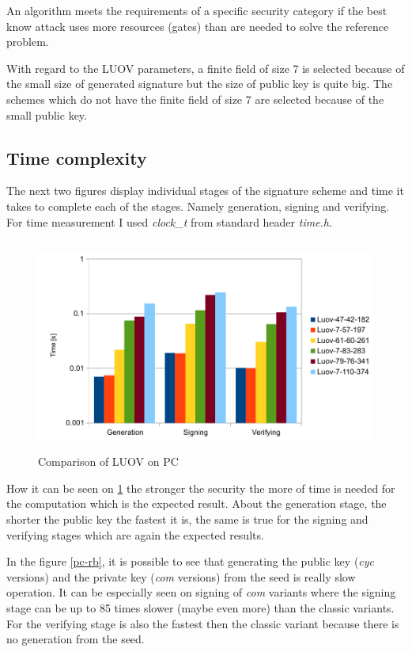 \documentclass[thesis=M,english]{FITthesis}[2019/12/23]
\begin{document}
\bigskip
\noindent
An algorithm meets the requirements of a specific security category if the best know attack uses more resources (gates) than are needed to solve the reference problem.

\bigskip
\noindent
With regard to the LUOV parameters, a finite field of size 7 is selected because of the small size of generated signature but the size of public key is quite big. The schemes which do not have the finite field of size 7 are selected because of the small public key.

\subsection{Time complexity} \label{time-complex-pc}
The next two figures display individual stages of the signature scheme and time it takes to complete each of the stages. Namely generation, signing and verifying. For time measurement I used \textit{clock\_t} from standard header \textit{time.h}. 
\begin{figure}[H]
\centering
\includegraphics[width=13cm,height=7cm]{images/pc-luov.pdf}
\caption{Comparison of LUOV on PC}
\label{pc-luov}
\end{figure}

\noindent
How it can be seen on \ref{pc-luov} the stronger the security the more of time is needed for the computation which is the expected result. About the generation stage, the shorter the public key the fastest it is, the same is true for the signing and  verifying stages which are again the expected results.

\bigskip
\noindent
In the figure \ref{pc-rb}, it is possible to see that generating the public key (\textit{cyc} versions) and the private key (\textit{com} versions) from the seed is really slow operation. It can be especially seen on signing of \textit{com} variants where the signing stage can be up to 85 times slower (maybe even more) than the classic variants. For the verifying stage is also the fastest then the classic variant because there is no generation from the seed.
\end{document}
